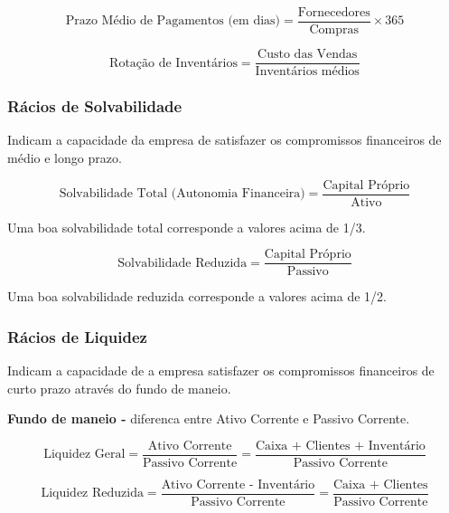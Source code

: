 \documentclass[11pt]{article}
\begin{document}
\begin{equation*}
    \textrm{Prazo Médio de Pagamentos (em dias)} = 
    \frac{\textrm{Fornecedores}}{\textrm{Compras}} \times 365
\end{equation*}

\begin{equation*}
    \textrm{Rotação de Inventários} = 
    \frac{\textrm{Custo das Vendas}}{\textrm{Inventários médios}}
\end{equation*}

\subsubsection{Rácios de Solvabilidade}

Indicam a capacidade da empresa de satisfazer os compromissos financeiros de médio e longo prazo.

\begin{equation*}
    \textrm{Solvabilidade Total (Autonomia Financeira)} = 
    \frac{\textrm{Capital Próprio}}{\textrm{Ativo}}
\end{equation*}

Uma boa solvabilidade total corresponde a valores acima de 1/3.

\begin{equation*}
    \textrm{Solvabilidade Reduzida} = 
    \frac{\textrm{Capital Próprio}}{\textrm{Passivo}}
\end{equation*}

Uma boa solvabilidade reduzida corresponde a valores acima de 1/2.

\subsubsection{Rácios de Liquidez}

Indicam a capacidade de a empresa satisfazer os compromissos financeiros de curto prazo através do fundo de maneio.

\textbf{Fundo de maneio -} diferenca entre Ativo Corrente e Passivo Corrente.

\begin{equation*}
    \textrm{Liquidez Geral} = 
    \frac{\textrm{Ativo Corrente}}{\textrm{Passivo Corrente}} =
    \frac{\textrm{Caixa + Clientes + Inventário}}{\textrm{Passivo Corrente}}
\end{equation*}

\begin{equation*}
    \textrm{Liquidez Reduzida} = 
    \frac{\textrm{Ativo Corrente - Inventário}}{\textrm{Passivo Corrente}} =
    \frac{\textrm{Caixa + Clientes}}{\textrm{Passivo Corrente}}
\end{equation*}
\end{document}
